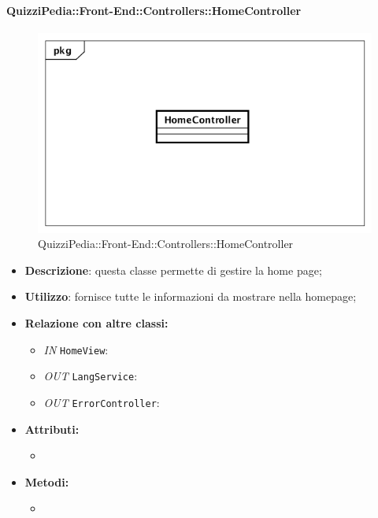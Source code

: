 \paragraph{QuizziPedia::Front-End::Controllers::HomeController}
\begin{figure}
	\centering
	\includegraphics[scale=0.45]{UML/Classi/Front-End/QuizziPedia_Front-end_Controller_HomeController.png}
	\caption{QuizziPedia::Front-End::Controllers::HomeController}
\end{figure}
\begin{itemize}
	\item \textbf{Descrizione}: questa classe permette di gestire la home page;
	\item \textbf{Utilizzo}: fornisce tutte le informazioni da mostrare nella homepage;
	\item \textbf{Relazione con altre classi:}
	\begin{itemize}
		\item \textit{IN} \texttt{HomeView}: 
		\item \textit{OUT} \texttt{LangService}:
		\item \textit{OUT} \texttt{ErrorController}:  
	\end{itemize}
	\item \textbf{Attributi:}
	\begin{itemize}
		\item 
	\end{itemize}
	\item \textbf{Metodi:}
	\begin{itemize}
		\item 
	\end{itemize}
\end{itemize}

